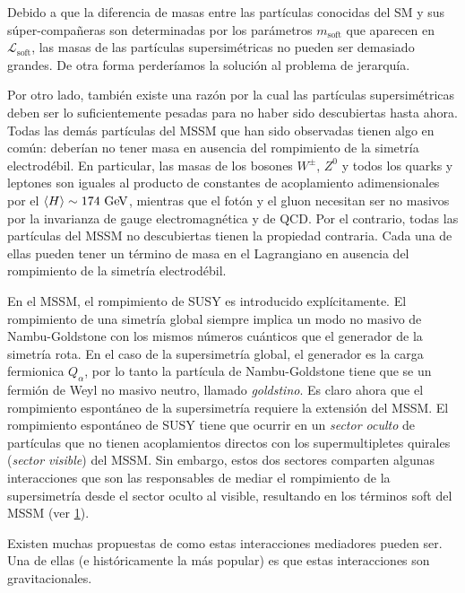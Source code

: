 Debido a que la diferencia de masas entre las partículas conocidas del SM y sus
súper-compañeras son determinadas por los parámetros $m_\text{soft}$ que
aparecen en $\mathcal{L}_\text{soft}$, las masas de las partículas
supersimétricas no pueden ser demasiado grandes. De otra forma perderíamos la
solución al problema de jerarquía.

Por otro lado, también existe una razón por la cual las partículas
supersimétricas deben ser lo suficientemente pesadas para no haber sido
descubiertas hasta ahora. Todas las demás partículas del MSSM que han sido
observadas tienen algo en común: deberían no tener masa en ausencia del
rompimiento de la simetría electrodébil. En particular, las masas de los
bosones $W^\pm$, $Z^0$ y todos los quarks y leptones son iguales al producto de
constantes de acoplamiento adimensionales por el $\avg{H} \sim 174 \gev$,
mientras que el fotón y el gluon necesitan ser no masivos por la invarianza de
gauge electromagnética y de QCD. Por el contrario, todas las partículas del MSSM
no descubiertas tienen la propiedad contraria. Cada una de ellas pueden tener un
término de masa en el Lagrangiano en ausencia del rompimiento de la simetría
electrodébil.

En el MSSM, el rompimiento de SUSY es introducido explícitamente. El rompimiento
de una simetría global siempre implica un modo no masivo de Nambu-Goldstone con
los mismos números cuánticos que el generador de la simetría rota. En el caso de
la supersimetría global, el generador es la carga fermionica $Q_\alpha$, por lo
tanto la partícula de Nambu-Goldstone tiene que se un fermión de Weyl no masivo
neutro, llamado \emph{goldstino}. Es claro ahora que el rompimiento espontáneo
de la supersimetría requiere la extensión del MSSM. El rompimiento espontáneo de
SUSY tiene que ocurrir en un \emph{sector oculto} de partículas que no tienen
acoplamientos directos con los supermultipletes quirales (\emph{sector visible})
del MSSM. Sin embargo, estos dos sectores comparten algunas interacciones que
son las responsables de mediar el rompimiento de la supersimetría desde el
sector oculto al visible, resultando en los términos soft del MSSM (ver
\cref{fig:susy_breaking}).

\begin{figure}[!htbp]
  \centering
  
  \caption{}\label{fig:susy_breaking}
\end{figure}

Existen muchas propuestas de como estas interacciones mediadores pueden ser. Una
de ellas (e históricamente la más popular) es que estas interacciones son
gravitacionales.

